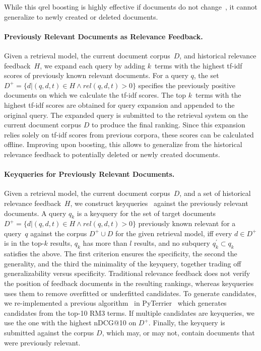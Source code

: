     
While this qrel boosting is highly effective if documents do not change~\cite{alkhalifa:2024,keller:2024b}, it cannot generalize to newly created or deleted documents.

\paragraph{Previously Relevant Documents as Relevance Feedback.} Given a retrieval model, the current document corpus~$D$, and historical relevance feedback~$H$, we expand each query by adding $k$~terms with the highest tf-idf scores of previously known relevant documents. For a query $q$, the set $D^{+} = \{d| (q,d,t) \in H \wedge rel(q,d,t) > 0\}$ specifies the previously positive documents on which we calculate the tf-idf scores. The top $k$~terms with the highest tf-idf scores are obtained for query expansion and appended to the original query. The expanded query is submitted to the retrieval system on the current document corpus $D$ to produce the final ranking. Since this expansion relies solely on tf-idf scores from previous corpora, these scores can be calculated offline. Improving upon boosting, this allows to generalize from the historical relevance feedback to potentially deleted or newly created documents.


\paragraph{Keyqueries for Previously Relevant Documents.} Given a retrieval model, the current document corpus~$D$, and a set of historical relevance feedback~$H$, we construct keyqueries~\cite{froebe:2021c,gollub:2013a,hagen:2016b} against the previously relevant documents. A query $q_{k}$ is a keyquery for the set of target documents $D^{+} = \{d| (q,d,t) \in H \wedge rel(q,d,t) > 0\}$ previously known relevant for a query~$q$ against the corpus $D^{+} \cup D$ for the given retrieval model, iff \Ni every $d \in D^{+}$ is in the top-$k$ results, \Nii $q_{k}$ has more than $l$ results, and \Niii no subquery $q^{'}_{k} \subset q_{k}$ satisfies the above. The first criterion ensures the specificity, the second the generality, and the third the minimality of the keyquery, together trading off generalizability versus specificity. Traditional relevance feedback does not verify the position of feedback documents in the resulting rankings, whereas keyqueries uses them to remove overfitted or underfitted candidates. To generate candidates, we re-implemented a previous algorithm~\cite{froebe:2022c} in PyTerrier~\cite{macdonald:2020} which generates candidates from the top-10 RM3 terms. If multiple candidates are keyqueries, we use the one with the highest nDCG@10 on $D^{+}$. Finally, the keyquery is submitted against the corpus $D$, which may, or may not, contain documents that were previously relevant.

